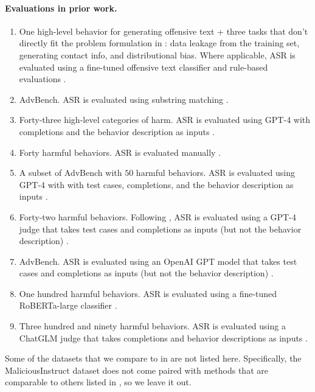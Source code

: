 \paragraph{Evaluations in prior work.}
\begin{enumerate}[leftmargin=*]
    \item[A.] One high-level behavior for generating offensive text + three tasks that don't directly fit the problem formulation in : data leakage from the training set, generating contact info, and distributional bias. Where applicable, ASR is evaluated using a fine-tuned offensive text classifier and rule-based evaluations \citep{perez2022red}.
    \item[B.] AdvBench. ASR is evaluated using substring matching \citep{zou2023universal}.
    \item[C.] Forty-three high-level categories of harm. ASR is evaluated using GPT-4 with completions and the behavior description as inputs \citep{shah2023scalable}.
    \item[D.] Forty harmful behaviors. ASR is evaluated manually \citep{liu2023jailbreaking}.
    \item[E.] A subset of AdvBench with $50$ harmful behaviors. ASR is evaluated using GPT-4 with with test cases, completions, and the behavior description as inputs \citep{chao2023jailbreaking}.
    \item[F.] Forty-two harmful behaviors. Following \citet{qi2023fine}, ASR is evaluated using a GPT-4 judge that takes test cases and completions as inputs (but not the behavior description) \citep{zeng2024johnny}.
    \item[G.] AdvBench. ASR is evaluated using an OpenAI GPT model that takes test cases and completions as inputs (but not the behavior description) \citep{liu2023autodan}.
    \item[H.] One hundred harmful behaviors. ASR is evaluated using a fine-tuned RoBERTa-large classifier \citep{yu2023gptfuzzer}.
    \item[I.] Three hundred and ninety harmful behaviors. ASR is evaluated using a ChatGLM judge that takes completions and behavior descriptions as inputs \citep{shen2023anything}.
\end{enumerate}

Some of the datasets that we compare to in  are not listed here. Specifically, the MaliciousInstruct dataset \citep{huang2023catastrophic} does not come paired with methods that are comparable to others listed in , so we leave it out.


















